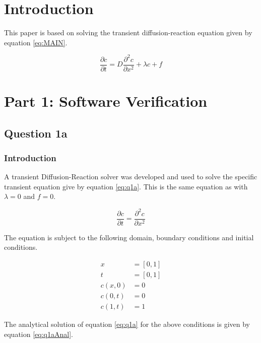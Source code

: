 \documentclass[11pt]{article}
\begin{document}


\clearpage
{}
\section{Introduction}

This paper is based on solving the transient diffusion-reaction equation given by equation \ref{eq:MAIN}.


\begin{equation}\label{eq:MAIN}
\frac{\partial c}{\partial t}    = D\frac{\partial^2 c}{\partial x^2} + \lambda c + f
\end{equation}


\section{Part 1: Software Verification}

\subsection{Question 1a}
\subsubsection{Introduction}

A transient Diffusion-Reaction solver was developed and used to solve the specific transient equation give by equation \ref{eq:q1a}. This is the same equation as \label{eq:MAIN} with $\lambda = 0$ and $f = 0$. 

\begin{equation} \label{eq:q1a}
\frac{\partial c}{\partial t}    = \frac{\partial^2 c}{\partial x^2}
\end{equation}

The equation is subject to the following domain, boundary conditions and initial conditions.

\begin{equation*}
\begin{split}
x &= [0,1] \\
t &= [0,1] \\
c(x,0) &= 0 \\
c(0,t) &= 0 \\
c(1,t) &= 1
\end{split}
\end{equation*}

The analytical solution of equation \ref{eq:q1a} for the above conditions is given by equation \ref{eq:q1aAnal}.
\end{document}

